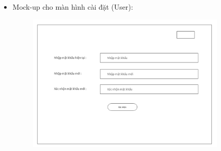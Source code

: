 \documentclass{article}
\begin{document}
\begin{itemize}
\begin{figure}[H]
    \end{figure}
    \item Mock-up cho màn hình cài đặt (User):
    \begin{figure}[H]
        \centering
        \includegraphics[width=0.9\textwidth]{Ảnh chương 4/Màn hình cài đặt User.png}
    \end{figure}
\end{itemize}
\vspace{3cm}\
\end{document}
